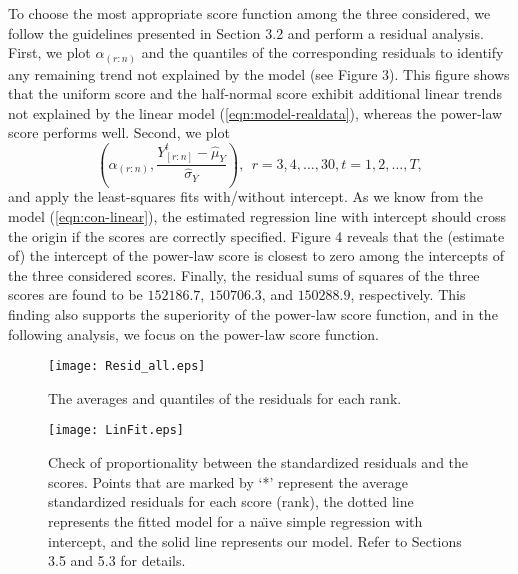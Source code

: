 \documentclass[12pt]{article}
\begin{document}
To choose the most appropriate score function among the three considered, 
we follow the guidelines presented in Section 3.2
and perform a residual analysis. First, we plot $\alpha_{(r:n)}$ and the quantiles 
of the corresponding residuals to identify any remaining trend not explained by the model 
(see Figure 3). This figure
shows that the uniform score and the half-normal score exhibit additional linear trends 
not explained by the linear model (\ref{eqn:model-realdata}), whereas the 
power-law score performs well. Second, 
we plot  
\begin{equation} \nonumber 
\left(\alpha_{(r:n)}, \frac{Y_{[r:n]}^t - \widehat{\mu}_Y}{\widehat{\sigma}_Y} \right), ~~r=3,4,\ldots,30,
t=1,2,\ldots,T,
\end{equation}
and apply the least-squares fits with/without intercept. As we know from the model 
(\ref{eqn:con-linear}), the estimated regression line with intercept should cross the origin if the scores are correctly 
specified. Figure 4 reveals that the (estimate of) the intercept of the power-law score is closest to zero 
among the intercepts of the three considered scores. 
Finally, the residual sums of squares of the three scores are found to be 
$152186.7$, $150706.3$, and $150288.9$, respectively. This finding also 
supports the superiority of the power-law score function, and in the following analysis, we focus on
the power-law score function.



\begin{figure}[htb!]
 \centering
\begin{minipage}{0.7\textwidth}
  \texttt{[image: Resid\_all.eps]}
\end{minipage} %
\caption{The averages and quantiles of the residuals for each rank.}
\end{figure}


\begin{figure}[htb!]
 \centering
\begin{minipage}{0.7\textwidth}
 \texttt{[image: LinFit.eps]}
\end{minipage}
\caption{Check of proportionality between the standardized residuals
and the scores. Points that are marked by `*' represent the average standardized residuals for each score (rank),
the dotted line represents the fitted model for a na\"{\i}ve simple regression with intercept, and the solid line represents our model.
Refer to Sections 3.5 and 5.3 for details.} 
\end{figure}
\end{document}
